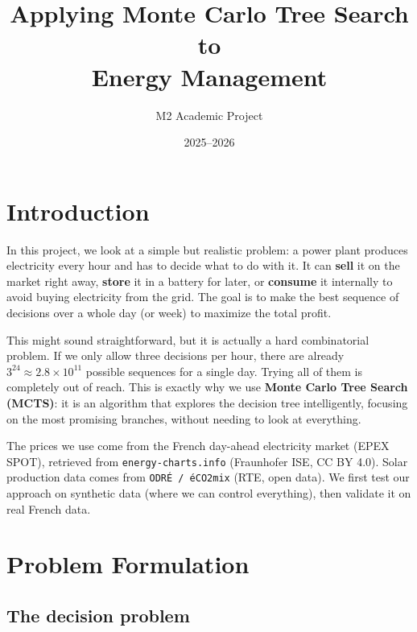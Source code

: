 \documentclass[12pt,a4paper]{article}
\title{\textbf{Applying Monte Carlo Tree Search to\\Energy Management}}
\author{M2 Academic Project}
\date{2025--2026}
\begin{document}
\maketitle
\tableofcontents
\newpage

\section{Introduction}

In this project, we look at a simple but realistic problem: a power plant
produces electricity every hour and has to decide what to do with it. It can
\textbf{sell} it on the market right away, \textbf{store} it in a battery for
later, or \textbf{consume} it internally to avoid buying electricity from the
grid. The goal is to make the best sequence of decisions over a whole day (or
week) to maximize the total profit.

This might sound straightforward, but it is actually a hard combinatorial
problem. If we only allow three decisions per hour, there are already
$3^{24} \approx 2.8 \times 10^{11}$ possible sequences for a single day.
Trying all of them is completely out of reach. This is exactly why we use
\textbf{Monte Carlo Tree Search (MCTS)}: it is an algorithm that explores the
decision tree intelligently, focusing on the most promising branches, without
needing to look at everything.

The prices we use come from the French day-ahead electricity market
(EPEX SPOT), retrieved from \texttt{energy-charts.info} (Fraunhofer ISE,
CC BY 4.0). Solar production data comes from \texttt{ODRÉ / éCO2mix} (RTE,
open data). We first test our approach on synthetic data (where we can control
everything), then validate it on real French data.

\section{Problem Formulation}

\subsection{The decision problem}
\end{document}

